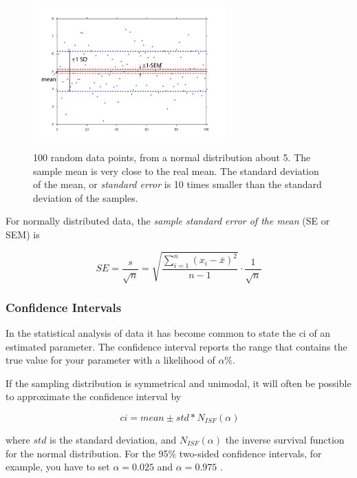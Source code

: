 \begin{figure}[ht]
  \centering
  \includegraphics[width=0.66\textwidth]{../Images/standardError.jpg}\\
  \caption{100 random data points, from a normal distribution about 5. The sample mean is very close to the real mean. The standard deviation of the mean, or \emph{standard error} is 10 times smaller than the standard deviation of the samples.}
  \label{fig:sem}
\end{figure}

For normally distributed data, the \emph{sample standard error of the mean} (SE or SEM) is

\begin{equation}
  SE = \frac{s}{\sqrt{n}} = \sqrt{\frac{{\sum\limits_{i = 1}^n {({x_i-\bar{x}})^2} }}{n-1}} \cdot \frac{1}{\sqrt{n}}
\end{equation}

\subsubsection{Confidence Intervals}

 In the statistical analysis of data it has become common to state the \acrfull{ci} of an estimated parameter. The confidence interval reports the range that contains the true value for your parameter with a likelihood of $\alpha$\%.

If the sampling distribution is symmetrical and unimodal, it will often be possible to approximate the confidence interval by

\begin{equation}\
  ci = mean \pm std * N_{ISF}(\alpha)
\end{equation}\label{eq:ci}

where $std$ is the  standard deviation, and $N_{ISF}(\alpha)$ the inverse survival function for the normal distribution. For the 95\% two-sided confidence intervals, for example, you have to set $\alpha=0.025$ and $\alpha=0.975$ .

